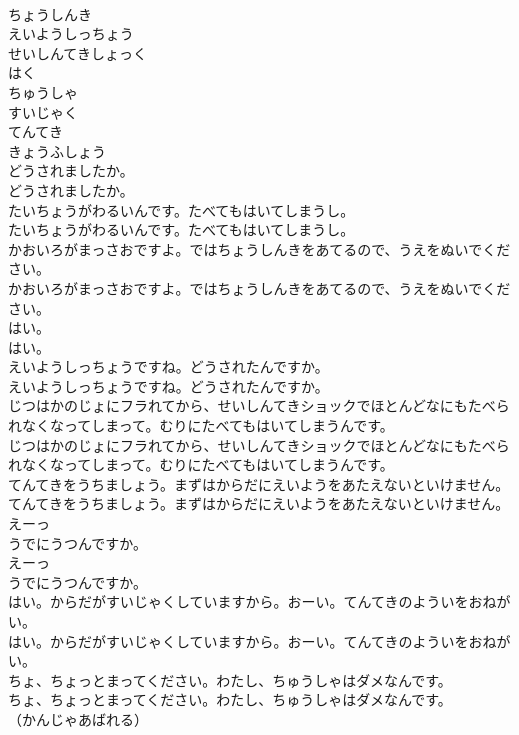 \documentclass[8pt]{extreport}
\begin{document}
\begin{CJK}{UTF8}{min}
\\	ちょうしんき
\\	えいようしっちょう
\\	せいしんてきしょっく
\\	はく
\\	ちゅうしゃ
\\	すいじゃく
\\	てんてき
\\	きょうふしょう
\\	どうされましたか。
\\	どうされましたか。
\\	たいちょうがわるいんです。たべてもはいてしまうし。
\\	たいちょうがわるいんです。たべてもはいてしまうし。
\\	かおいろがまっさおですよ。ではちょうしんきをあてるので、うえをぬいでください。
\\	かおいろがまっさおですよ。ではちょうしんきをあてるので、うえをぬいでください。
\\	はい。
\\	はい。
\\	えいようしっちょうですね。どうされたんですか。
\\	えいようしっちょうですね。どうされたんですか。
\\	じつはかのじょにフラれてから、せいしんてきショックでほとんどなにもたべられなくなってしまって。むりにたべてもはいてしまうんです。
\\	じつはかのじょにフラれてから、せいしんてきショックでほとんどなにもたべられなくなってしまって。むりにたべてもはいてしまうんです。
\\	てんてきをうちましょう。まずはからだにえいようをあたえないといけません。
\\	てんてきをうちましょう。まずはからだにえいようをあたえないといけません。
\\	えーっ
\\	うでにうつんですか。
\\	えーっ
\\	うでにうつんですか。
\\	はい。からだがすいじゃくしていますから。おーい。てんてきのよういをおねがい。
\\	はい。からだがすいじゃくしていますから。おーい。てんてきのよういをおねがい。
\\	ちょ、ちょっとまってください。わたし、ちゅうしゃはダメなんです。
\\	ちょ、ちょっとまってください。わたし、ちゅうしゃはダメなんです。
\\	（かんじゃあばれる）

\end{CJK}
\end{document}
